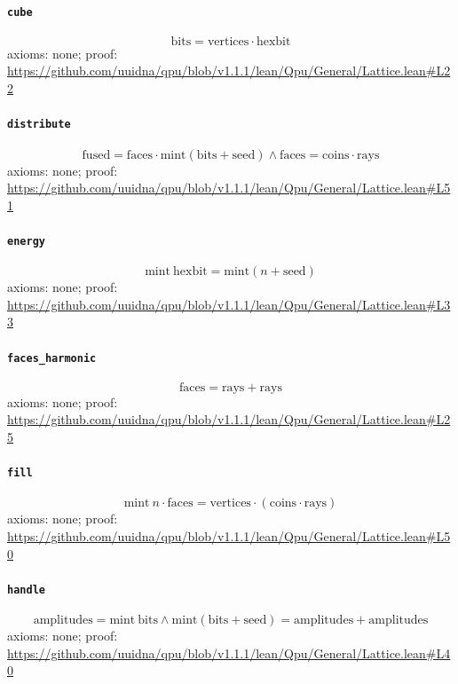 \documentclass[11pt]{article}
\begin{document}
\paragraph{\texttt{cube}}
\[ \mathrm{bits} = \mathrm{vertices} \cdot \mathrm{hexbit} \]
\noindent axioms: none; proof: \url{https://github.com/uuidna/qpu/blob/v1.1.1/lean/Qpu/General/Lattice.lean\#L22}

\paragraph{\texttt{distribute}}
\[ \mathrm{fused} = \mathrm{faces} \cdot \mathrm{mint} (\mathrm{bits} + \mathrm{seed}) \land \mathrm{faces} = \mathrm{coins} \cdot \mathrm{rays} \]
\noindent axioms: none; proof: \url{https://github.com/uuidna/qpu/blob/v1.1.1/lean/Qpu/General/Lattice.lean\#L51}

\paragraph{\texttt{energy}}
\[ \mathrm{mint}\ \mathrm{hexbit} = \mathrm{mint} (n + \mathrm{seed}) \]
\noindent axioms: none; proof: \url{https://github.com/uuidna/qpu/blob/v1.1.1/lean/Qpu/General/Lattice.lean\#L33}

\paragraph{\texttt{faces\_harmonic}}
\[ \mathrm{faces} = \mathrm{rays} + \mathrm{rays} \]
\noindent axioms: none; proof: \url{https://github.com/uuidna/qpu/blob/v1.1.1/lean/Qpu/General/Lattice.lean\#L25}

\paragraph{\texttt{fill}}
\[ \mathrm{mint}\ n \cdot \mathrm{faces} = \mathrm{vertices} \cdot (\mathrm{coins} \cdot \mathrm{rays}) \]
\noindent axioms: none; proof: \url{https://github.com/uuidna/qpu/blob/v1.1.1/lean/Qpu/General/Lattice.lean\#L50}

\paragraph{\texttt{handle}}
\[ \mathrm{amplitudes} = \mathrm{mint}\ \mathrm{bits} \land \mathrm{mint} (\mathrm{bits} + \mathrm{seed}) = \mathrm{amplitudes} + \mathrm{amplitudes} \]
\noindent axioms: none; proof: \url{https://github.com/uuidna/qpu/blob/v1.1.1/lean/Qpu/General/Lattice.lean\#L40}
\end{document}
